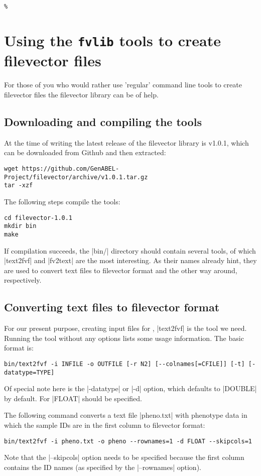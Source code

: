\begin{lstlisting}[escapechar=\%]


%
\end{lstlisting}


\section{Using the \lstinline{fvlib} tools to create filevector files}
For those of you who would rather use 'regular' command line tools to
create filevector files the filevector library can be of help.

\subsection{Downloading and compiling the tools}
At the time of writing the latest release of the filevector library is
v1.0.1, which can be downloaded from Github and then extracted:
\begin{lstlisting}[basicstyle=\footnotesize\ttfamily]
wget https://github.com/GenABEL-Project/filevector/archive/v1.0.1.tar.gz
tar -xzf
\end{lstlisting}

The following steps compile the tools:
\begin{lstlisting}
cd filevector-1.0.1
mkdir bin
make
\end{lstlisting}
If compilation succeeds, the |bin/| directory should contain several
tools, of which |text2fvf| and |fv2text| are the most interesting. As
their names already hint, they are used to convert text files to
filevector format and the other way around, respectively.

\subsection{Converting text files to filevector format}
For our present purpose, creating input files for \oanomm, |text2fvf|
is the tool we need. Running the tool without any options lists some
usage information. The basic format is:
\begin{lstlisting}[basicstyle=\footnotesize\ttfamily]
bin/text2fvf -i INFILE -o OUTFILE [-r N2] [--colnames[=CFILE]] [-t] [-datatype=TYPE]
\end{lstlisting}
Of special note here is the |-datatype| or |-d| option, which defaults to
|DOUBLE| by default. For \oanomm |FLOAT| should be specified.

The following command converts a text file |pheno.txt| with phenotype
data in which the sample IDs are in the first column to filevector
format:
\begin{lstlisting}[basicstyle=\footnotesize\ttfamily]
bin/text2fvf -i pheno.txt -o pheno --rownames=1 -d FLOAT --skipcols=1
\end{lstlisting}
Note that the |--skipcols| option needs to be specified because the
first column contains the ID names (as specified by the |--rownames|
option).

